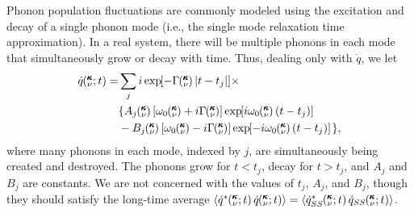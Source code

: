Phonon population fluctuations are commonly modeled using the excitation 
and decay of
a single phonon mode (i.e., the single mode relaxation time approximation).
In a real system, there will be multiple phonons in
each mode that simultaneously grow or decay with time.  Thus, dealing 
only
with $\dot{q}$, we let
\begin{equation}\label{A:E:qdot_A_kvbat}
\begin{split}
\dot{q}\kvt =& \sum_j i\EXP{-\Gamma\kv |t-t_j|}\times \\
& \lbrace A_j\kv\left[\omega_0\kv+i\Gamma\kv\right]
\EXP{i\omega_0\kv (t-t_j)} \\
& -B_j\kv \left[\omega_0\kv-i\Gamma\kv\right]\EXP{-i\omega_0\kv (t-t_j) }
\; \rbrace,
\end{split}
\end{equation}
where many phonons in each mode, indexed by $j$, are simultaneously 
being
created and destroyed.  The phonons grow for $t<t_j$, decay for $t>t_j$,
and $A_j$ and $B_j$ are constants.  We are  not concerned with the 
values of
$t_j$, $A_j$, and $B_j$, though they should satisfy the long-time average
$\langle\dot{q}^*\kvt\dot{q}\kvt\rangle = \langle\dot{q}_{SS}^*\kvt
\dot{q}_{SS}\kvt\rangle$.

